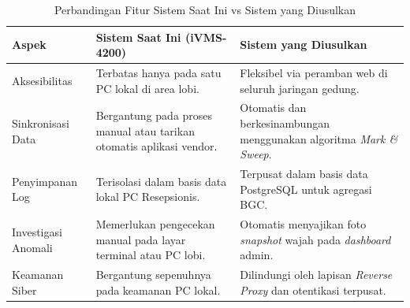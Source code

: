 \begin{table}[t]
    \centering
    \caption{Perbandingan Fitur Sistem Saat Ini vs Sistem yang Diusulkan}
    \label{tab:perbandingan_sistem}
    \begin{tabular}{|l|p{6cm}|p{6cm}|}
        \hline
        \textbf{Aspek} & \textbf{Sistem Saat Ini (iVMS-4200)} & \textbf{Sistem yang Diusulkan} \\
        \hline
        Aksesibilitas & Terbatas hanya pada satu PC lokal di area lobi. & Fleksibel via peramban web di seluruh jaringan gedung. \\
        \hline
        Sinkronisasi Data & Bergantung pada proses manual atau tarikan otomatis aplikasi vendor. & Otomatis dan berkesinambungan menggunakan algoritma \textit{Mark \& Sweep}. \\
        \hline
        Penyimpanan Log & Terisolasi dalam basis data lokal PC Resepsionis. & Terpusat dalam basis data PostgreSQL untuk agregasi BGC. \\
        \hline
        Investigasi Anomali & Memerlukan pengecekan manual pada layar terminal atau PC lobi. & Otomatis menyajikan foto \textit{snapshot} wajah pada \textit{dashboard} admin. \\
        \hline
        Keamanan Siber & Bergantung sepenuhnya pada keamanan PC lokal. & Dilindungi oleh lapisan \textit{Reverse Proxy} dan otentikasi terpusat. \\
        \hline
    \end{tabular}
\end{table}
